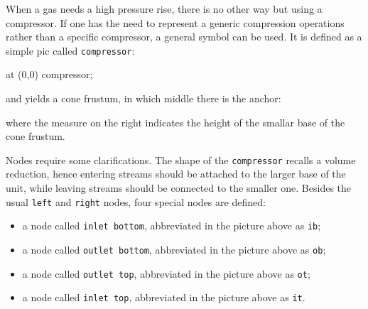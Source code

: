 \documentclass[12pt]{article}						%
\newcommand*{\chpn}[1]{\texttt{#1}}				%
\newcommand*{\chpp}[1]{\texttt{#1}}				%
\begin{document}
When a gas needs a high pressure rise, there is no other way but using a
compressor. If one has the need to represent a generic compression operations
rather than a specific compressor, a general symbol can be used. It is defined
as a simple pic called \chpp{compressor}:
\begin{chpcode}
	\pic at (0,0) {compressor};
\end{chpcode}
and yields a cone frustum, in which middle there is the anchor:
\begin{center}
\end{center}
where the measure on the right indicates the height of the smallar base of the
cone frustum.

Nodes require some clarifications. The shape of the \chpp{compressor} recalls a
volume reduction, hence entering streams should be attached to the larger base of
the unit, while leaving streams should be connected to the smaller one. Besides
the usual \chpn{left} and \chpn{right} nodes, four special nodes are defined:
\begin{itemize}
	\item a node called \chpn{inlet bottom}, abbreviated in the picture above as
		\chpn{ib};
	\item a node called \chpn{outlet bottom}, abbreviated in the picture above as
		\chpn{ob};
	\item a node called \chpn{outlet top}, abbreviated in the picture above as
		\chpn{ot};
	\item a node called \chpn{inlet top}, abbreviated in the picture above as
		\chpn{it}.
\end{itemize}
\end{document}
